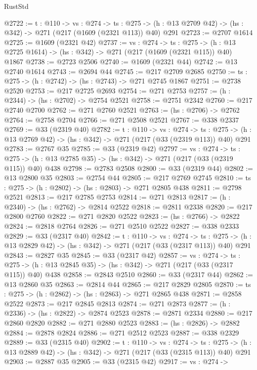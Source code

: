 \begin{lexlean}{RustStd}
\begin{coremodule}
@2722 := {t : @110} ->
  {vs : @274} ->
  {ts : @275} -> (h : @13 @2709 @42) -> (hs : @342) -> @271 (@217 (@1609 (@2321 @113)) @40) @291
@2723 := @2707 @1614
@2725 := @1609 (@2321 @42)
@2737 := {vs : @274} ->
  {ts : @275} -> (h : @13 @2725 @1614) -> (hs : @342) -> @271 (@217 (@1609 (@2321 @115)) @40) @1867
@2738 := @2723 @2506
@2740 := @1609 (@2321 @44)
@2742 := @13 @2740 @1614
@2743 := @2694 @44
@2745 := @217 @2709 @2685
@2750 := {ts : @275} -> (h : @2742) -> (hs : @2743) -> @271 @2745 @1867
@2751 := @2738 @2520
@2753 := @217 @2725 @2693
@2754 := @271 @2753
@2757 := (h : @2344) -> (hs : @2702) -> @2754 @2521
@2758 := @2751 @2342
@2760 := @217 @2740 @2700
@2762 := @271 @2760 @2521
@2763 := (hs : @2706) -> @2762
@2764 := @2758 @2704
@2766 := @271 @2508 @2521
@2767 := @338 @2337
@2769 := @33 (@2319 @40)
@2782 := {t : @110} ->
  {vs : @274} ->
  {ts : @275} -> (h : @13 @2769 @42) -> (hs : @342) -> @271 (@217 (@33 (@2319 @113)) @40) @291
@2783 := @2767 @35
@2785 := @33 (@2319 @42)
@2797 := {vs : @274} ->
  {ts : @275} -> (h : @13 @2785 @35) -> (hs : @342) -> @271 (@217 (@33 (@2319 @115)) @40) @438
@2798 := @2783 @2508
@2800 := @33 (@2319 @44)
@2802 := @13 @2800 @35
@2803 := @2754 @44
@2805 := @217 @2769 @2745
@2810 := {ts : @275} -> (h : @2802) -> (hs : @2803) -> @271 @2805 @438
@2811 := @2798 @2521
@2813 := @217 @2785 @2753
@2814 := @271 @2813
@2817 := (h : @2340) -> (hs : @2762) -> @2814 @2522
@2818 := @2811 @2338
@2820 := @217 @2800 @2760
@2822 := @271 @2820 @2522
@2823 := (hs : @2766) -> @2822
@2824 := @2818 @2764
@2826 := @271 @2510 @2522
@2827 := @338 @2333
@2829 := @33 (@2317 @40)
@2842 := {t : @110} ->
  {vs : @274} ->
  {ts : @275} -> (h : @13 @2829 @42) -> (hs : @342) -> @271 (@217 (@33 (@2317 @113)) @40) @291
@2843 := @2827 @35
@2845 := @33 (@2317 @42)
@2857 := {vs : @274} ->
  {ts : @275} -> (h : @13 @2845 @35) -> (hs : @342) -> @271 (@217 (@33 (@2317 @115)) @40) @438
@2858 := @2843 @2510
@2860 := @33 (@2317 @44)
@2862 := @13 @2860 @35
@2863 := @2814 @44
@2865 := @217 @2829 @2805
@2870 := {ts : @275} -> (h : @2862) -> (hs : @2863) -> @271 @2865 @438
@2871 := @2858 @2522
@2873 := @217 @2845 @2813
@2874 := @271 @2873
@2877 := (h : @2336) -> (hs : @2822) -> @2874 @2523
@2878 := @2871 @2334
@2880 := @217 @2860 @2820
@2882 := @271 @2880 @2523
@2883 := (hs : @2826) -> @2882
@2884 := @2878 @2824
@2886 := @271 @2512 @2523
@2887 := @338 @2329
@2889 := @33 (@2315 @40)
@2902 := {t : @110} ->
  {vs : @274} ->
  {ts : @275} -> (h : @13 @2889 @42) -> (hs : @342) -> @271 (@217 (@33 (@2315 @113)) @40) @291
@2903 := @2887 @35
@2905 := @33 (@2315 @42)
@2917 := {vs : @274} ->

\end{coremodule}
\end{lexlean}
